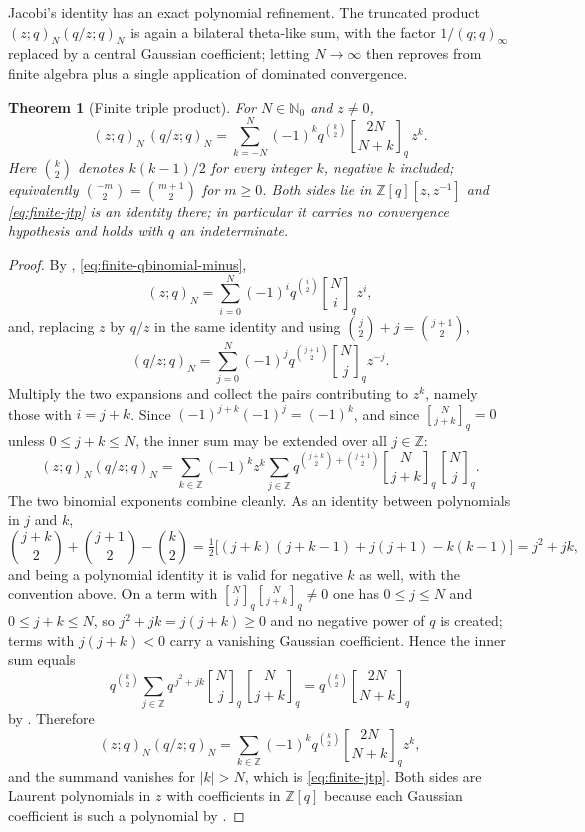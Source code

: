 \documentclass[11pt,oneside,openany]{book}
\newtheorem{theorem}{Theorem}[chapter]
\theoremstyle{definition}
\theoremstyle{remark}
\newcommand{\qbinom}[2]{\genfrac{[}{]}{0pt}{}{#1}{#2}_{q}}
\newcommand{\Z}{\mathbb Z}
\newcommand{\N}{\mathbb N}
\newcommand{\abs}[1]{\lvert #1\rvert}
\begin{document}
Jacobi's identity has an exact polynomial refinement.  The truncated product $(z;q)_N(q/z;q)_N$ is again a bilateral theta-like sum, with the factor $1/(q;q)_\infty$ replaced by a central Gaussian coefficient; letting $N\to\infty$ then reproves  from finite algebra plus a single application of dominated convergence.

\begin{theorem}[Finite triple product]\label{thm:finite-jtp}
For $N\in\N_0$ and $z\ne0$,
\begin{equation}
 (z;q)_N\,(q/z;q)_N
 =\sum_{k=-N}^{N}(-1)^k q^{\binom k2}
 \qbinom{2N}{N+k}\,z^{k}.
 \label{eq:finite-jtp}
\end{equation}
Here $\binom k2$ denotes $k(k-1)/2$ for every integer $k$, negative $k$ included; equivalently $\binom{-m}{2}=\binom{m+1}{2}$ for $m\ge0$.
Both sides lie in $\Z[q][z,z^{-1}]$ and \eqref{eq:finite-jtp} is an identity there; in particular it carries no convergence hypothesis and holds with $q$ an indeterminate.
\end{theorem}

\begin{proof}
By , \eqref{eq:finite-qbinomial-minus},
\[
 (z;q)_N=\sum_{i=0}^{N}(-1)^iq^{\binom i2}\qbinom Ni z^{i},
\]
and, replacing $z$ by $q/z$ in the same identity and using $\binom j2+j=\binom{j+1}{2}$,
\[
 (q/z;q)_N=\sum_{j=0}^{N}(-1)^jq^{\binom{j+1}{2}}\qbinom Nj z^{-j}.
\]
Multiply the two expansions and collect the pairs contributing to $z^{k}$, namely those with $i=j+k$.  Since $(-1)^{j+k}(-1)^{j}=(-1)^k$, and since $\qbinom N{j+k}=0$ unless $0\le j+k\le N$, the inner sum may be extended over all $j\in\Z$:
\[
 (z;q)_N(q/z;q)_N
 =\sum_{k\in\Z}(-1)^kz^{k}
 \sum_{j\in\Z}q^{\binom{j+k}{2}+\binom{j+1}{2}}
 \qbinom N{j+k}\,\qbinom Nj .
\]
The two binomial exponents combine cleanly.  As an identity between polynomials in $j$ and $k$,
\[
 \binom{j+k}{2}+\binom{j+1}{2}-\binom k2
 =\tfrac12\bigl[(j+k)(j+k-1)+j(j+1)-k(k-1)\bigr]
 =j^2+jk,
\]
and being a polynomial identity it is valid for negative $k$ as well, with the convention above.  On a term with $\qbinom Nj\qbinom N{j+k}\ne0$ one has $0\le j\le N$ and $0\le j+k\le N$, so $j^2+jk=j(j+k)\ge0$ and no negative power of $q$ is created; terms with $j(j+k)<0$ carry a vanishing Gaussian coefficient.  Hence the inner sum equals
\[
 q^{\binom k2}\sum_{j\in\Z}q^{\,j^2+jk}
 \qbinom Nj\,\qbinom N{j+k}
 =q^{\binom k2}\qbinom{2N}{N+k}
\]
by .  Therefore
\[
 (z;q)_N(q/z;q)_N
 =\sum_{k\in\Z}(-1)^kq^{\binom k2}\qbinom{2N}{N+k}z^{k},
\]
and the summand vanishes for $\abs k>N$, which is \eqref{eq:finite-jtp}.  Both sides are Laurent polynomials in $z$ with coefficients in $\Z[q]$ because each Gaussian coefficient is such a polynomial by .
\end{proof}
\end{document}

